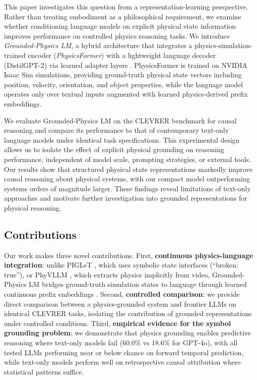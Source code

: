 \documentclass[conference]{IEEEtran}
\theoremstyle{plain}
\theoremstyle{definition}
\theoremstyle{remark}
\begin{document}
This paper investigates this question from a representation-learning perspective. Rather than treating embodiment as a philosophical requirement, we examine whether conditioning language models on explicit physical state information improves performance on controlled physics reasoning tasks. We introduce \emph{Grounded-Physics LM}, a hybrid architecture that integrates a physics-simulation-trained encoder (\emph{PhysicsFormer}) with a lightweight language decoder (DistilGPT-2) via learned adapter layers \cite{houlsby2019adapters}. PhysicsFormer is trained on NVIDIA Isaac Sim simulations, providing ground-truth physical state vectors including position, velocity, orientation, and object properties, while the language model operates only over textual inputs augmented with learned physics-derived prefix embeddings.

We evaluate Grounded-Physics LM on the CLEVRER benchmark \cite{yi2020clevrer} for causal reasoning and compare its performance to that of contemporary text-only language models under identical task specifications. This experimental design allows us to isolate the effect of explicit physical grounding on reasoning performance, independent of model scale, prompting strategies, or external tools. Our results show that structured physical state representations markedly improve causal reasoning about physical systems, with our compact model outperforming systems orders of magnitude larger. These findings reveal limitations of text-only approaches and motivate further investigation into grounded representations for physical reasoning.

\subsection{Contributions}

Our work makes three novel contributions. First, \textbf{continuous physics-language integration}: unlike PIGLeT \cite{zellers2021piglet}, which uses symbolic state interfaces (``broken: true''), or PhyVLLM \cite{zhan2025phyvllm}, which extracts physics implicitly from video, Grounded-Physics LM bridges ground-truth simulation states to language through learned continuous prefix embeddings \cite{li2021prefix}. Second, \textbf{controlled comparison}: we provide direct comparison between a physics-grounded system and frontier LLMs on identical CLEVRER tasks, isolating the contribution of grounded representations under controlled conditions. Third, \textbf{empirical evidence for the symbol grounding problem}: we demonstrate that physics grounding enables predictive reasoning where text-only models fail (60.0\% vs 18.6\% for GPT-4o), with all tested LLMs performing near or below chance on forward temporal prediction, while text-only models perform well on retrospective causal attribution where statistical patterns suffice.
\end{document}
